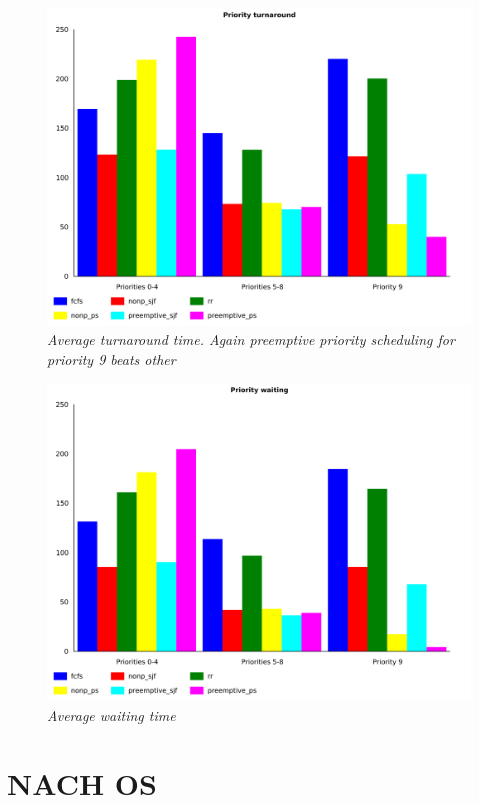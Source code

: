 \documentclass{article}
\begin{document}
\begin{figure}[ht]
\centerline{\includegraphics[scale=1]{priority_turnaround_averages}}
\caption{{\it Average turnaround time. Again preemptive priority scheduling for priority 9 beats other}}  
\label{surf}
\end{figure}
\begin{figure}[ht]
\centerline{\includegraphics[scale=1]{priority_waiting_averages}}
\caption{{\it Average waiting time}}  
\label{surf}
\end{figure}

\section*{NACH OS}
\end{document}
